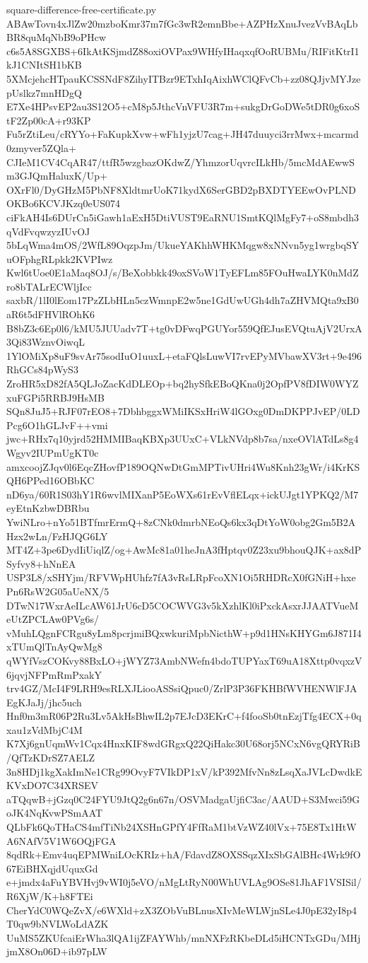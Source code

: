 \documentclass[11pt]{article}
\theoremstyle{definition}
\theoremstyle{remark}
\begin{document}
\begin{filecontents*}[overwrite]{square-difference-free-certificate.py}
ABAwTovn4xJlZw20mzboKmr37m7fGc3wR2emnBbe+AZPHzXnuJvezVvBAqLbBR8quMqNbB9oPHcw
c6s5A8SGXBS+6IkAtKSjmdZ88oxiOVPax9WHfyIHaqxqfOoRUBMu/RIFitKtrI1kJ1CNItSH1bKB
5XMcjehcHTpauKCSSNdF8ZihyITBzr9ETxhIqAixhWClQFvCb+zz08QJjvMYJzepUslkz7mnHDgQ
E7Xe4HPsvEP2au3S12O5+cM8p5JthcVnVFU3R7m+sukgDrGoDWe5tDR0g6xoStF2Zp00cA+r93KP
Fu5rZtiLeu/cRYYo+FaKupkXvw+wFh1yjzU7cag+JH47duuyci3rrMwx+mcarmd0zmyver5ZQla+
CJIeM1CV4CqAR47/ttfR5wzgbazOKdwZ/YhmzorUqvrcILkHb/5mcMdAEwwSm3GJQmHaluxK/Up+
OXrFl0/DyGHzM5PbNF8XldtmrUoK71kydX6SerGBD2pBXDTYEEwOvPLNDOKBo6KCVJKzq0eUS074
ciFkAH4Is6DUrCn5iGawh1aExH5DtiVUST9EaRNU1SmtKQlMgFy7+oS8mbdh3qVdFvqwzyzIUvOJ
5bLqWma4mOS/2WfL89OqzpJm/UkueYAKhhWHKMqgw8xNNvn5yg1wrgbqSYuOFphgRLpkk2KVPIwz
Kwl6tUoe0E1aMaq8OJ/s/BeXobbkk49oxSVoW1TyEFLm85FOuHwaLYK0nMdZro8bTALrECWljIcc
saxbR/1lI0lEom17PzZLbHLn5czWmnpE2w5ne1GdUwUGh4dh7aZHVMQta9xB0aR6t5dFHVlROhK6
B8bZ3c6Ep0l6/kMU5JUUadv7T+tg0vDFwqPGUYor559QfEJusEVQtuAjV2UrxA3Qi83WznvOiwqL
1YlOMiXp8uF9svAr75sodIuO1uuxL+etaFQlsLuwVI7rvEPyMVbawXV3rt+9e496RhGCs84pWyS3
ZroHR5xD82fA5QLJoZacKdDLEOp+bq2hySfkEBoQKna0j2OpfPV8fDIW0WYZxuFGPi5RRBJ9HsMB
SQn8JuJ5+RJF07rEO8+7DbhbggxWMiIKSxHriW4lGOxg0DmDKPPJvEP/0LDPcg6O1hGLJvF++vmi
jwc+RHx7q10yjrd52HMMIBaqKBXp3UUxC+VLkNVdp8b7sa/nxeOVlATdLs8g4Wgyv2IUPmUgKT0c
amxcoojZJqv0l6EqcZHovfP189OQNwDtGmMPTivUHri4Wu8Knh23gWr/i4KrKSQH6PPed16OBbKC
nD6ya/60R1S03hY1R6wvlMIXanP5EoWXs61rEvVflELqx+ickUJgt1YPKQ2/M7eyEtnKzbwDBRbu
YwiNLro+nYo51BTfmrErmQ+8zCNk0dmrbNEoQs6kx3qDtYoW0obg2Gm5B2AHzx2wLn/FzHJQG6LY
MT4Z+3pe6DydIiUiqlZ/og+AwMc81a01heJnA3fHptqv0Z23xu9bhouQJK+ax8dPSyfvy8+hNnEA
USP3L8/xSHYjm/RFVWpHUhfz7fA3vRsLRpFcoXN1Oi5RHDRcX0fGNiH+hxePn6RsW2G05aUeNX/5
DTwN17WxrAeILcAW61JrU6cD5COCWVG3v5kXzhlKl0iPxckAsxrJJAATVueMeUtZPCLAw0PVg6s/
vMuhLQgnFCRgu8yLm8pcrjmiBQxwkuriMpbNicthW+p9d1HNsKHYGm6J871I4xTUmQlTnAyQwMg8
qWYfVszCOKvy88BxLO+jWYZ73AmbNWefn4bdoTUPYaxT69uA18Xttp0vqxzV6jqvjNFPmRmPxakY
trv4GZ/McI4F9LRH9esRLXJLiooASSsiQpuc0/ZrlP3P36FKHBfWVHENWlFJAEgKJaJj/jhc5uch
Hnf0m3mR06P2Ru3Lv5AkHsBhwIL2p7EJcD3EKrC+f4fooSb0tnEzjTfg4ECX+0qxau1zVdMbjC4M
K7Xj6gnUqmWv1Cqx4HnxKIF8wdGRgxQ22QiHakc30U68orj5NCxN6vgQRYRiB/QfTzKDrSZ7AELZ
3n8HDj1kgXakImNe1CRg99OvyF7VIkDP1xV/kP392MfvNn8zLsqXaJVLcDwdkEKVxDO7C34XRSEV
aTQqwB+jGzq0C24FYU9JtQ2g6n67n/OSVMadgaUjfiC3ac/AAUD+S3Mwci59GoJK4NqKvwPSmAAT
QLbFk6QoTHaCS4mfTiNb24XSHnGPfY4FfRaM1btVzWZ40lVx+75E8Tx1HtWA6NAfV5V1W6OQjFGA
8qdRk+Emv4uqEPMWniLOcKRIz+hA/FdavdZ8OXSSqzXIxSbGAlBHc4Wrk9fO67EiBHXqjdUquxGd
e+jmdx4aFuYBVHvj9vWI0j5eVO/nMgLtRyN00WhUVLAg9OSe81JhAF1VSISil/R6XjW/K+h8FTEi
CherYdC0WQeZvX/e6WXld+zX3ZObVuBLnusXIvMeWLWjnSLe4J0pE32yI8p4T0qw9bNVLWoLdAZK
UuMS5ZKUfcaiErWha3lQA1ijZFAYWhb/mnNXFzRKbeDLd5iHCNTxGDu/MHjjmX8On06D+ib97pLW

\end{filecontents*}
\end{document}
